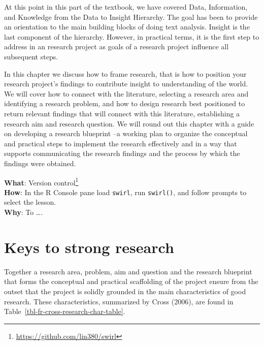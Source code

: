 \documentclass[
  letterpaper,
]{latex/krantz}
\DeclareRobustCommand{\href}[2]{#2\footnote{\url{#1}}}
\begin{document}
At this point in this part of the textbook, we have covered Data,
Information, and Knowledge from the Data to Insight Hierarchy. The goal
has been to provide an orientation to the main building blocks of doing
text analysis. Insight is the last component of the hierarchy. However,
in practical terms, it is the first step to address in an research
project as goals of a research project influence all subsequent steps.

In this chapter we discuss how to frame research, that is how to
position your research project's findings to contribute insight to
understanding of the world. We will cover how to connect with the
literature, selecting a research area and identifying a research
problem, and how to design research best positioned to return relevant
findings that will connect with this literature, establishing a research
aim and research question. We will round out this chapter with a guide
on developing a research blueprint --a working plan to organize the
conceptual and practical steps to implement the research effectively and
in a way that supports communicating the research findings and the
process by which the findings were obtained.

\begin{tcolorbox}[enhanced jigsaw, colframe=quarto-callout-tip-color-frame, titlerule=0mm, coltitle=black, colback=white, opacitybacktitle=0.6, colbacktitle=quarto-callout-tip-color!10!white, left=2mm, arc=.35mm, leftrule=.75mm, rightrule=.15mm, bottomtitle=1mm, toptitle=1mm, breakable, bottomrule=.15mm, title=\textcolor{quarto-callout-tip-color}{\faLightbulb}\hspace{0.5em}{Interactive programming}, toprule=.15mm, opacityback=0]

\textbf{What}: \href{https://github.com/lin380/swirl}{Version control}\\
\textbf{How}: In the R Console pane load \texttt{swirl}, run
\texttt{swirl()}, and follow prompts to select the lesson.\\
\textbf{Why}: To \ldots.

\end{tcolorbox}

\hypertarget{fr-keys}{%
\section{Keys to strong research}\label{fr-keys}}

Together a research area, problem, aim and question and the research
blueprint that forms the conceptual and practical scaffolding of the
project ensure from the outset that the project is solidly grounded in
the main characteristics of good research. These characteristics,
summarized by Cross (2006), are found in
Table~\ref{tbl-fr-cross-research-char-table}.
\end{document}
